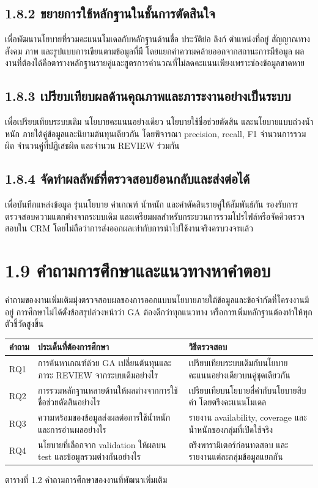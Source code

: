 \documentclass[12pt,a4paper]{report}
\begin{document}
\subsection*{1.8.2 ขยายการใช้หลักฐานในชั้นการตัดสินใจ}
เพื่อพัฒนานโยบายที่รวมคะแนนโมเดลกับหลักฐานด้านชื่อ ประวัติย่อ ลิงก์ ตำแหน่งที่อยู่ สัญญาณทางสังคม ภาพ และรูปแบบการเขียนตามข้อมูลที่มี โดยแยกค่าความคล้ายออกจากสถานะการมีข้อมูล ผลงานที่ต้องได้คือตารางหลักฐานรายคู่และสูตรการคำนวณที่ไม่ลดคะแนนเพียงเพราะช่องข้อมูลขาดหาย

\subsection*{1.8.3 เปรียบเทียบผลด้านคุณภาพและภาระงานอย่างเป็นระบบ}
เพื่อเปรียบเทียบระบบเดิม นโยบายคะแนนอย่างเดียว นโยบายใช้ชื่อช่วยตัดสิน และนโยบายแบบถ่วงน้ำหนัก ภายใต้คู่ข้อมูลและนิยามต้นทุนเดียวกัน โดยพิจารณา precision, recall, F1 จำนวนการรวมผิด จำนวนคู่ที่ปฏิเสธผิด และจำนวน REVIEW ร่วมกัน

\subsection*{1.8.4 จัดทำผลลัพธ์ที่ตรวจสอบย้อนกลับและส่งต่อได้}
เพื่อบันทึกแหล่งข้อมูล รุ่นนโยบาย ค่าเกณฑ์ น้ำหนัก และคำตัดสินรายคู่ให้สัมพันธ์กัน รองรับการตรวจสอบความแตกต่างจากระบบเดิม และเตรียมผลสำหรับกระบวนการรวมโปรไฟล์หรือจัดคิวตรวจสอบใน CRM โดยไม่ถือว่าการส่งออกผลเท่ากับการนำไปใช้งานจริงครบวงจรแล้ว

\section*{1.9 คำถามการศึกษาและแนวทางหาคำตอบ}
คำถามของงานเพิ่มเติมมุ่งตรวจสอบผลของการออกแบบนโยบายภายใต้ข้อมูลและข้อจำกัดที่โครงงานมีอยู่ การศึกษาไม่ได้ตั้งข้อสรุปล่วงหน้าว่า GA ต้องดีกว่าทุกแนวทาง หรือการเพิ่มหลักฐานต้องทำให้ทุกตัวชี้วัดสูงขึ้น

\begin{center}\small
\begin{tabularx}{\linewidth}{p{1.1cm}XX}
\toprule
คำถาม & ประเด็นที่ต้องการศึกษา & วิธีตรวจสอบ \\
\midrule
RQ1 & การค้นหาเกณฑ์ด้วย GA เปลี่ยนต้นทุนและภาระ REVIEW จากระบบเดิมอย่างไร & เปรียบเทียบระบบเดิมกับนโยบายคะแนนอย่างเดียวบนคู่ชุดเดียวกัน \\
RQ2 & การรวมหลักฐานหลายด้านให้ผลต่างจากการใช้ชื่อช่วยตัดสินอย่างไร & เปรียบเทียบนโยบายสี่ค่ากับนโยบายสิบค่า โดยตรึงคะแนนโมเดล \\
RQ3 & ความพร้อมของข้อมูลส่งผลต่อการใช้น้ำหนักและการอ่านผลอย่างไร & รายงาน availability, coverage และน้ำหนักของกลุ่มที่เปิดใช้จริง \\
RQ4 & นโยบายที่เลือกจาก validation ให้ผลบน test และข้อมูลรวมต่างกันอย่างไร & ตรึงพารามิเตอร์ก่อนทดสอบ และรายงานแต่ละกลุ่มข้อมูลแยกกัน \\
\bottomrule
\end{tabularx}
\par ตารางที่ 1.2 คำถามการศึกษาของงานที่พัฒนาเพิ่มเติม
\end{center}
\end{document}
